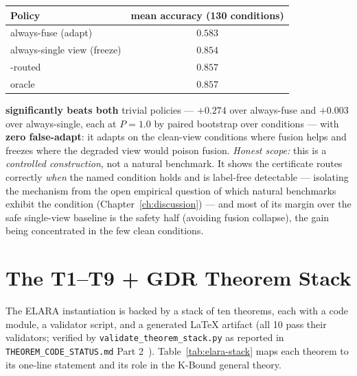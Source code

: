 \begin{center}
\begin{tabular}{lc}
\toprule
Policy & mean accuracy (130 conditions) \\
\midrule
always-fuse (adapt) & $0.583$ \\
always-single view (freeze) & $0.854$ \\
\KGA{}-routed & $\mathbf{0.857}$ \\
oracle & $0.857$ \\
\bottomrule
\end{tabular}
\end{center}

\KGA{} \textbf{significantly beats both} trivial policies --- $+0.274$ over always-fuse and $+0.003$
over always-single, each at $P{=}1.0$ by paired bootstrap over conditions --- with \textbf{zero
false-adapt}: it adapts on the clean-view conditions where fusion helps and freezes where the degraded
view would poison fusion.  \emph{Honest scope:} this is a \emph{controlled construction}, not a natural
benchmark.  It shows the certificate routes correctly \emph{when} the named condition holds and is
label-free detectable --- isolating the mechanism from the open empirical question of which natural
benchmarks exhibit the condition (Chapter~\ref{ch:discussion}) --- and most of its margin over the safe
single-view baseline is the safety half (avoiding fusion collapse), the gain being concentrated in the
few clean conditions.

\section{The T1--T9 + GDR Theorem Stack}\label{sec:elara-theorems}

The ELARA instantiation is backed by a stack of ten theorems, each with a code
module, a validator script, and a generated \LaTeX{} artifact (all 10 pass their
validators; verified by \texttt{validate\_theorem\_stack.py} as reported in
\texttt{THEOREM\_CODE\_STATUS.md} Part 2~\cite{kbound2026repo}).  Table~\ref{tab:elara-stack}
maps each theorem to its one-line statement and its role in the K-Bound general theory.

